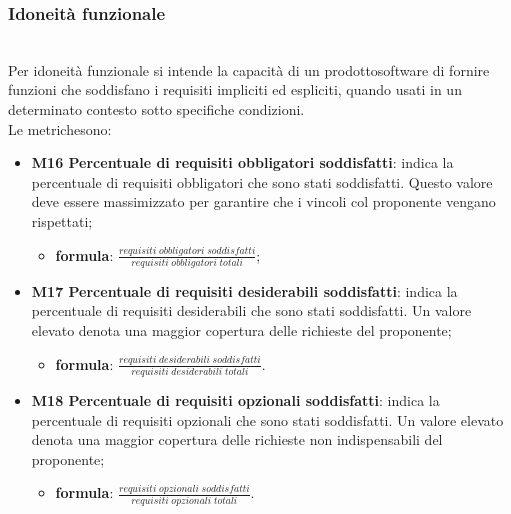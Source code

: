 		\subsubsection{Idoneità funzionale} \mbox{}\\[1mm]
		Per idoneità funzionale si intende la capacità di un prodotto\glosp software di fornire funzioni che soddisfano i requisiti impliciti ed espliciti, quando usati in un determinato contesto sotto specifiche condizioni. \\
		Le metriche\glosp sono:
		\begin{itemize}
			\item \textbf{M16 Percentuale di requisiti obbligatori soddisfatti}: indica la percentuale di requisiti obbligatori che sono stati soddisfatti. Questo valore deve essere massimizzato per garantire che i vincoli col proponente vengano rispettati;
			\begin{itemize}
				\item[] \textbf{formula}: $\frac{requisiti \; obbligatori \; soddisfatti}{requisiti \; obbligatori \; totali}$;
			\end{itemize} 
			\item \textbf{M17 Percentuale di requisiti desiderabili soddisfatti}:
			indica la percentuale di requisiti desiderabili che sono stati soddisfatti. Un valore elevato denota una maggior copertura delle richieste del proponente;
			\begin{itemize}
				\item[] \textbf{formula}: $\frac{requisiti \; desiderabili \; soddisfatti}{requisiti \; desiderabili \; totali}$.
			\end{itemize} 
			\item \textbf{M18 Percentuale di requisiti opzionali soddisfatti}:
			indica la percentuale di requisiti opzionali che sono stati soddisfatti. Un valore elevato denota una maggior copertura delle richieste non indispensabili  del proponente;
			\begin{itemize}
				\item[] \textbf{formula}: $\frac{requisiti \; opzionali \; soddisfatti}{requisiti \; opzionali \; totali}$.
			\end{itemize} 
		\end{itemize}
	

